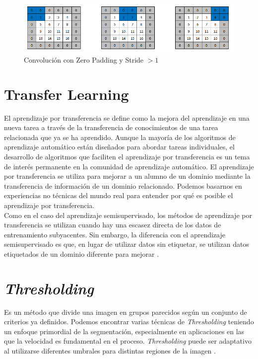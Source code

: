 \begin{figure}[ht]
 	\centering
 	\includegraphics[scale=0.5]{Figs/stride.png}
 	\caption{Convolución con Zero Padding y Stride $> 1$}
 	\label{stride}
 \end{figure}
 
 \newpage
\section{Transfer Learning}
El aprendizaje por transferencia se define como la mejora del aprendizaje en una nueva tarea a través de la transferencia de conocimientos de una tarea relacionada que ya se ha aprendido. Aunque la mayoría de los algoritmos de aprendizaje automático están diseñados para abordar tareas individuales, el desarrollo de algoritmos que faciliten el aprendizaje por transferencia es un tema de interés permanente en la comunidad de aprendizaje automático. El aprendizaje por transferencia se utiliza para mejorar a un alumno de un dominio mediante la transferencia de información de un dominio relacionado. Podemos basarnos en experiencias no técnicas del mundo real para entender por qué es posible el aprendizaje por transferencia.\\

Como en el caso del aprendizaje semisupervisado, los métodos de aprendizaje por transferencia se utilizan cuando hay una escasez directa de los datos de entrenamiento subyacentes. Sin embargo, la diferencia con el aprendizaje semisupervisado es que, en lugar de utilizar datos sin etiquetar, se utilizan datos etiquetados de un dominio diferente para mejorar \cite{ref_14}.

\section{\textit{Thresholding}}


Es un método que divide una imagen en grupos parecidos según un conjunto de criterios ya definidos. Podemos encontrar varias técnicas de \textit{Thresholding} teniendo un enfoque primordial de la segmentación, especialmente en aplicaciones en las que la velocidad es fundamental en el proceso. \textit{Thresholding} puede ser adaptativo al utilizarse diferentes umbrales para distintas regiones de la imagen \cite{kulkarni2012color}.


